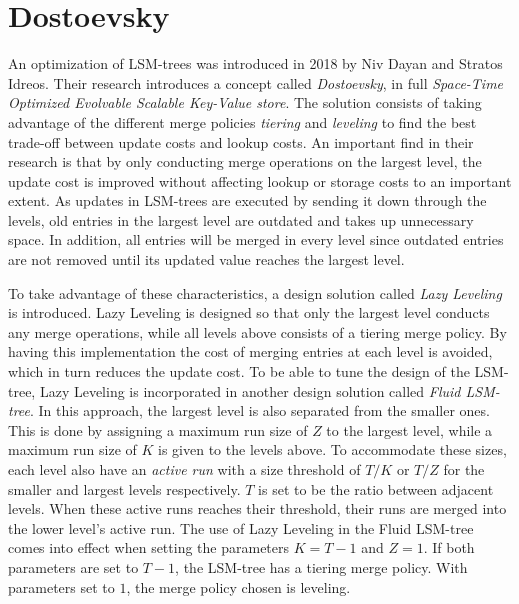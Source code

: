 \section{Dostoevsky}
\label{Dostoevsky}
An optimization of LSM-trees was introduced in 2018 by Niv Dayan and Stratos Idreos. Their research introduces a concept called \emph{Dostoevsky}, in full \emph{Space-Time Optimized Evolvable Scalable Key-Value store}\cite{Dostoevsky}. The solution consists of taking advantage of the different merge policies \emph{tiering} and \emph{leveling} to find the best trade-off between update costs and lookup costs. An important find in their research is that by only conducting merge operations on the largest level, the update cost is improved without affecting lookup or storage costs to an important extent. As updates in LSM-trees are executed by sending it down through the levels, old entries in the largest level are outdated and takes up unnecessary space. In addition, all entries will be merged in every level since outdated entries are not removed until its updated value reaches the largest level.\newline 

\noindent
To take advantage of these characteristics, a design solution called \emph{Lazy Leveling} is introduced. Lazy Leveling is designed so that only the largest level conducts any merge operations, while all levels above consists of a tiering merge policy. By having this implementation the cost of merging entries at each level is avoided, which in turn reduces the update cost. To be able to tune the design of the LSM-tree, Lazy Leveling is incorporated in another design solution called \emph{Fluid LSM-tree}. In this approach, the largest level is also separated from the smaller ones. This is done by assigning a maximum run size of $Z$ to the largest level, while a maximum run size of $K$ is given to the levels above. To accommodate these sizes, each level also have an \emph{active run} with a size threshold of $T/K$ or $T/Z$ for the smaller and largest levels respectively. $T$ is set to be the ratio between adjacent levels. When these active runs reaches their threshold, their runs are merged into the lower level's active run. The use of Lazy Leveling in the Fluid LSM-tree comes into effect when setting the parameters $K=T-1$ and $Z = 1$. If both parameters are set to $T-1$, the LSM-tree has a tiering merge policy. With parameters set to $1$, the merge policy chosen is leveling. \newline

